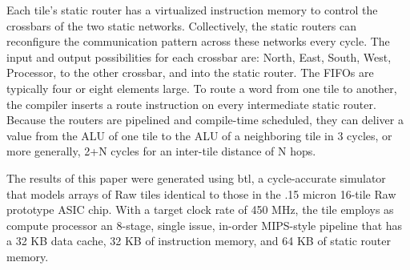 Each tile's static router has a virtualized instruction memory to
control the crossbars of the two static networks. Collectively, the
static routers can reconfigure the communication pattern across these
networks every cycle.  The input and output possibilities for each
crossbar are: North, East, South, West, Processor, to the other
crossbar, and into the static router. The FIFOs are typically four or
eight elements large.  To route a word from one tile to another, the
compiler inserts a route instruction on every intermediate static
router.  Because the routers are pipelined and compile-time scheduled,
they can deliver a value from the ALU of one tile to the ALU of a
neighboring tile in 3 cycles, or more generally, 2+N cycles for an
inter-tile distance of N hops.

The results of this paper were generated using btl, a cycle-accurate
simulator that models arrays of Raw tiles identical to those in the
.15 micron 16-tile Raw prototype ASIC chip.  With a target clock rate
of 450 MHz, the tile employs as compute processor an 8-stage, single
issue, in-order MIPS-style pipeline that has a 32 KB data cache, 32 KB
of instruction memory, and 64 KB of static router memory.
